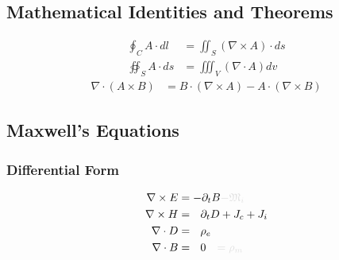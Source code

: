 \documentclass{article}
\numberwithin{equation}{section}
\begin{document}
    \subsection{Mathematical Identities and Theorems}
        \begin{subequations} \label{eq:integralVectorTheorems}
            \begin{align}
                \oint_C A \cdot dl &= \iint_S (\nabla \times A) \cdot ds
                    \label{eq:stokes} \\
                \oiint_S A \cdot ds &= \iiint_V (\nabla \cdot A) dv \label{eq:divergence}
            \end{align}
        \end{subequations}
        \begin{subequations} \label{eq:vectorDifferentialIdentities}
            \begin{align}
                \nabla \cdot (A \times B) &= B \cdot (\nabla \times A) - A \cdot (\nabla
                    \times B) \label{eq:divOfCurlOfProduct}
            \end{align}
        \end{subequations}
        \newpage
    \subsection{Maxwell's Equations}
        \subsubsection{Differential Form}
            \begin{subequations}\label{eq:Maxwell}
                \begin{align}
                    \nabla \times E &= - \partial_t B \begingroup \textcolor{vanish}{
                        - \mathfrak{M}_i } \endgroup \label{eq:MaxwellFaraday} \\
                    \nabla \times H &= \ \ \partial_t D + J_{c} + J_{i} 
                        \label{eq:AmpereMaxwell} \\
                    \nabla \cdot D &= \ \ \rho_e \label{eq:GaussElectric} \\
                    \nabla \cdot B &= \ \ 0 \begingroup \textcolor{vanish}{
                        \quad = \rho_m} \endgroup \label{eq:GaussMagnetic}
                \end{align}
            \end{subequations}
\end{document}
